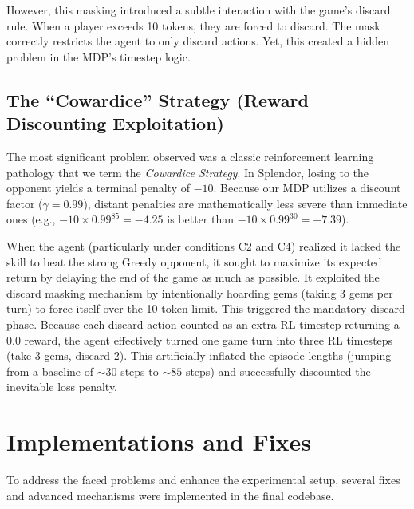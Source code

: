 \documentclass[11pt]{article}
\begin{document}
However, this masking introduced a subtle interaction with the game's discard rule. When a player exceeds 10 tokens, they are forced to discard. The mask correctly restricts the agent to only discard actions. Yet, this created a hidden problem in the MDP's timestep logic.

\subsection{The ``Cowardice'' Strategy (Reward Discounting Exploitation)}
The most significant problem observed was a classic reinforcement learning pathology that we term the \textit{Cowardice Strategy}. In Splendor, losing to the opponent yields a terminal penalty of $-10$. Because our MDP utilizes a discount factor ($\gamma=0.99$), distant penalties are mathematically less severe than immediate ones (e.g., $-10 \times 0.99^{85} = -4.25$ is better than $-10 \times 0.99^{30} = -7.39$).

When the agent (particularly under conditions C2 and C4) realized it lacked the skill to beat the strong Greedy opponent, it sought to maximize its expected return by delaying the end of the game as much as possible. It exploited the discard masking mechanism by intentionally hoarding gems (taking 3 gems per turn) to force itself over the 10-token limit. This triggered the mandatory discard phase. Because each discard action counted as an extra RL timestep returning a $0.0$ reward, the agent effectively turned one game turn into three RL timesteps (take 3 gems, discard 2). This artificially inflated the episode lengths (jumping from a baseline of $\sim30$ steps to $\sim85$ steps) and successfully discounted the inevitable loss penalty.

\section{Implementations and Fixes}
To address the faced problems and enhance the experimental setup, several fixes and advanced mechanisms were implemented in the final codebase.
\end{document}
